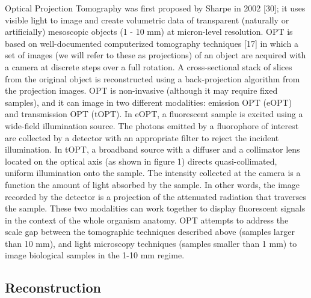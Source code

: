 Optical Projection Tomography was first proposed by Sharpe in 2002 [30]; it uses visible light to image and create volumetric data of transparent (naturally or artificially) mesoscopic objects (1 - 10 mm) at micron-level resolution.
OPT is based on well-documented computerized tomography techniques [17] in which a set of images (we will refer to these as projections) of an object are acquired with a camera at discrete steps over a full rotation.
A cross-sectional stack of slices from the original object is reconstructed using a back-projection algorithm from the projection images.
OPT is non-invasive (although it may require fixed samples), and it can image in two different modalities: emission OPT (eOPT) and transmission OPT (tOPT).
In eOPT, a fluorescent sample is excited using a wide-field illumination source.
The photons emitted by a fluorophore of interest are collected by a detector with an appropriate filter to reject the incident illumination.
In tOPT, a broadband source with a diffuser and a collimator lens located on the optical axis (as shown in figure 1) directs quasi-collimated, uniform illumination onto the sample.
The intensity collected at the camera is a function the amount of light absorbed by the sample.
In other words, the image recorded by the detector is a projection of the attenuated radiation that traverses the sample.
These two modalities can work together to display fluorescent signals in the context of the whole organism anatomy.
OPT attempts to address the scale gap between the tomographic techniques described above (samples larger than 10 mm), and light microscopy techniques (samples smaller than 1 mm) to image biological samples in the 1-10 mm regime.

\subsection{Reconstruction}

